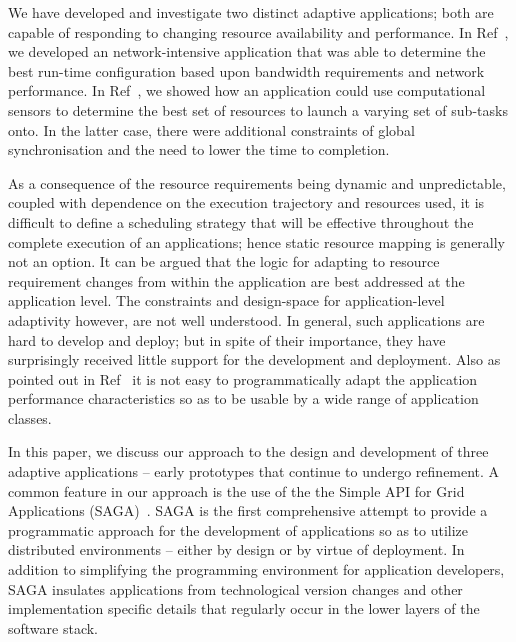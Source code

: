 \documentclass[a4paper,10pt]{article}
\begin{document}


We have developed and investigate two distinct adaptive applications;
both are capable of responding to changing resource availability and
performance.  In Ref~\cite{saga_escience07x}, we developed an
network-intensive application that was able to determine the best
run-time configuration based upon bandwidth requirements and network
performance. In Ref~\cite{saga_tg08}, we showed how an application
could use computational sensors to determine the best set of resources
to launch a varying set of sub-tasks onto.  In the latter case, there
were additional constraints of global synchronisation and the need to
lower the time to completion.

As a consequence of the resource requirements being dynamic and
unpredictable, coupled with dependence on the execution trajectory and
resources used, it is difficult to define a scheduling strategy that
will be effective throughout the complete execution of an
applications; hence static resource mapping is generally not an
option.  It can be argued that the logic for adapting to resource
requirement changes from within the application are best addressed at
the application level. The constraints and design-space for
application-level adaptivity however, are not well understood.  In
general, such applications are hard to develop and deploy; but in
spite of their importance, they have surprisingly received little
support for the development and deployment.  Also as pointed out in
Ref~\cite{apples03} it is not easy to programmatically adapt the
application performance characteristics so as to be usable by a wide
range of application classes.

In this paper, we discuss our approach to the design and development
of three adaptive applications -- early prototypes that continue to
undergo refinement.  A common feature in our approach is the use of
the the Simple API for Grid Applications (SAGA)~\cite{saga_gfd90}.
SAGA is the first comprehensive attempt to provide a programmatic
approach for the development of applications so as to utilize
distributed environments -- either by design or by virtue of
deployment.  In addition to simplifying the programming environment
for application developers, SAGA insulates applications from
technological version changes and other implementation specific
details that regularly occur in the lower layers of the software
stack.
\end{document}
